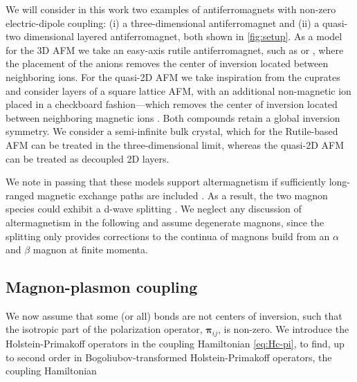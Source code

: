 \documentclass[aps,prb,reprint,twocolumns,superscriptaddress,nofootinbib]{revtex4-2}
\begin{document}
	We will consider in this work two examples of antiferromagnets with non-zero electric-dipole coupling: (i) a  three-dimensional antiferromagnet and (ii) a quasi-two dimensional layered antiferromagnet, both shown in \cref{fig:setup}. As a model for the 3D AFM we take an easy-axis rutile antiferromagnet, such as  or , where the placement of the anions removes the center of inversion located between neighboring ions. For the quasi-2D AFM we take inspiration from the cuprates and consider layers of a square lattice AFM, with an additional non-magnetic ion placed in a checkboard fashion---which removes the center of inversion located between neighboring magnetic ions \cite{shanDynamicMagneticPhase2024}. Both compounds retain a global inversion symmetry. 	
	We consider a semi-infinite bulk crystal, which for the Rutile-based AFM can be treated in the three-dimensional limit, whereas the quasi-2D AFM can be treated as decoupled 2D layers. 
	
	We note in passing that these models support altermagnetism \cite{smejkalEmergingResearchLandscape2022,smejkalConventionalFerromagnetismAntiferromagnetism2022} if sufficiently long-ranged magnetic exchange paths are included \cite{liuChiralSplitMagnon2024,smejkalChiralMagnonsAltermagnetic2023, gohlkeSpuriousSymmetryEnhancement2023}. As a result, the two magnon species could exhibit a d-wave splitting \cite{smejkalChiralMagnonsAltermagnetic2023}. We neglect any discussion of altermagnetism in the following and assume degenerate magnons, since the splitting only provides corrections to the continua of magnons build from an $\alpha$ and $\beta$ magnon at finite momenta.
	
	
	
	
	
	
	
	
	
	
	
	
	
	
	
	
	
	\subsection{Magnon-plasmon coupling}
	We now assume that some (or all) bonds are not centers of inversion, such that the isotropic part of the polarization operator, $\bm\pi_{ij}$, is non-zero.
	We introduce the Holstein-Primakoff operators in the coupling Hamiltonian \cref{eq:Hc-pi}, to find, up to second order in Bogoliubov-transformed Holstein-Primakoff operators, the coupling Hamiltonian
	
\end{document}
